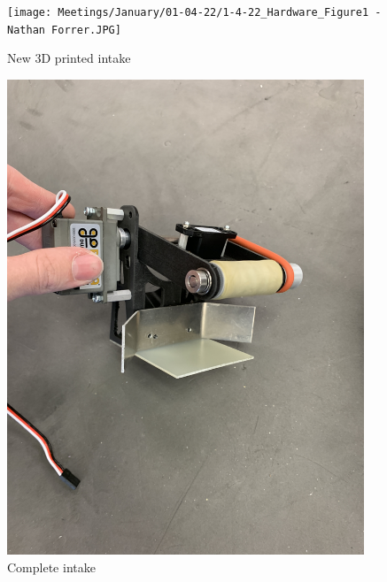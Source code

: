 \begin{figure}[ht]
\centering
\begin{minipage}[b]{.48\textwidth}
  \centering
  \texttt{[image: Meetings/January/01-04-22/1-4-22\_Hardware\_Figure1 - Nathan Forrer.JPG]}
  \caption{New 3D printed intake}
  \label{fig:010422_2}
\end{minipage}%
\hfill%
\begin{minipage}[b]{.48\textwidth}
  \centering
  \includegraphics[width=0.95\textwidth]{Meetings/January/01-04-22/1-4-22_Hardware_Figure2 - Nathan Forrer.JPG}
  \caption{Complete intake}
  \label{fig:010422_3}
\end{minipage}
\end{figure}

